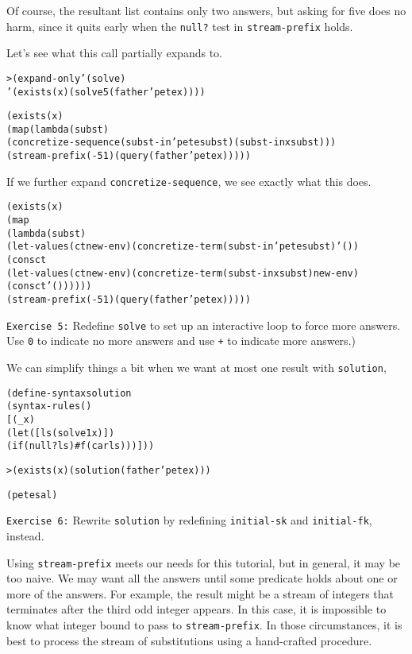 \noindent
Of course, the resultant list contains only two answers, but
asking for five does no harm, since it quits early when the
\texttt{null?} test in \texttt{stream-prefix} holds.  

Let's see what this call partially expands to.
\begin{alltt}
> (expand-only '(solve)
    '(exists (x) (solve 5 (father 'pete x))))

(exists (x)
  (map (lambda (subst)
         (concretize-sequence (subst-in 'pete subst) (subst-in x subst)))
       (stream-prefix (- 5 1) (query (father 'pete x)))))
\end{alltt}

If we further expand \texttt{concretize-sequence}, we see
exactly what this does.

\begin{alltt}
(exists (x)
  (map 
    (lambda (subst)
      (let-values (ct new-env) (concretize-term (subst-in 'pete subst) '())
        (cons ct
          (let-values (ct new-env) (concretize-term (subst-in x subst) new-env)
            (cons ct '())))))
    (stream-prefix (- 5 1) (query (father 'pete x)))))
\end{alltt}

\texttt{Exercise 5:} Redefine \texttt{solve} to set up an interactive
loop to force more answers.  Use \texttt{0} to indicate no more
answers and use \texttt{+} to indicate more answers.)

We can simplify things a bit when we want at most one result with
\texttt{solution},

\begin{alltt}
(define-syntax solution
  (syntax-rules ()
    [(_ x)
     (let ([ls (solve 1 x)])
       (if (null? ls) #f (car ls)))]))
\end{alltt}

\begin{alltt}
> (exists (x) (solution (father 'pete x)))

(pete sal)
\end{alltt}

\texttt{Exercise 6:} Rewrite \texttt{solution} by redefining
\texttt{initial-sk} and \texttt{initial-fk}, instead.

Using \texttt{stream-prefix} meets our needs for this tutorial, but in
general, it may be too naive.  We may want all the answers until some
predicate holds about one or more of the answers.  For example, the
result might be a stream of integers that terminates after the third odd
integer appears.  In this case, it is impossible to know what integer bound
to pass to \texttt{stream-prefix}.  In those circumstances, it is best
to process the stream of substitutions using a hand-crafted procedure.

